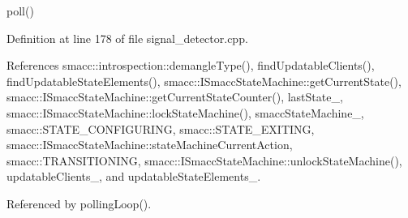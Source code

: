poll() 

Definition at line 178 of file signal\+\_\+detector.\+cpp.



References smacc\+::introspection\+::demangle\+Type(), find\+Updatable\+Clients(), find\+Updatable\+State\+Elements(), smacc\+::\+I\+Smacc\+State\+Machine\+::get\+Current\+State(), smacc\+::\+I\+Smacc\+State\+Machine\+::get\+Current\+State\+Counter(), last\+State\+\_\+, smacc\+::\+I\+Smacc\+State\+Machine\+::lock\+State\+Machine(), smacc\+State\+Machine\+\_\+, smacc\+::\+S\+T\+A\+T\+E\+\_\+\+C\+O\+N\+F\+I\+G\+U\+R\+I\+NG, smacc\+::\+S\+T\+A\+T\+E\+\_\+\+E\+X\+I\+T\+I\+NG, smacc\+::\+I\+Smacc\+State\+Machine\+::state\+Machine\+Current\+Action, smacc\+::\+T\+R\+A\+N\+S\+I\+T\+I\+O\+N\+I\+NG, smacc\+::\+I\+Smacc\+State\+Machine\+::unlock\+State\+Machine(), updatable\+Clients\+\_\+, and updatable\+State\+Elements\+\_\+.



Referenced by polling\+Loop().



